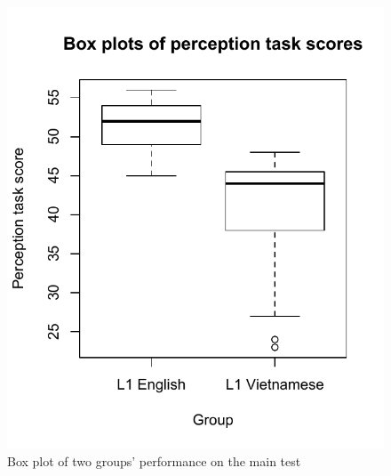 \documentclass[a4paper]{article}
\begin{document}
\begin{figure}[H]
\begin{center}  
\includegraphics[scale=0.7]{perceptionboxplot.pdf} 
\caption{Box plot of two groups' performance on the main test}
\label{fig:perceptionboxplot}
\end{center}   
\end{figure}


\end{document}
